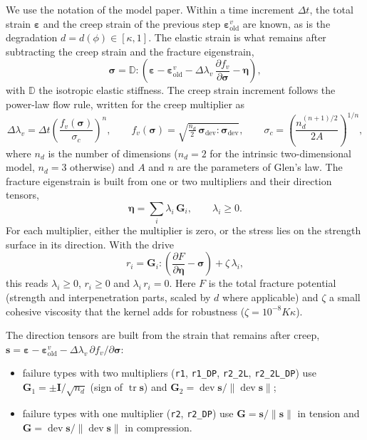 \documentclass[11pt,a4paper]{article}
\newcommand{\bsig}{\bm{\sigma}}
\newcommand{\beps}{\bm{\varepsilon}}
\newcommand{\bfeta}{\bm{\eta}}
\newcommand{\bG}{\bm{G}}
\newcommand{\tr}{\operatorname{tr}}
\newcommand{\dev}{\operatorname{dev}}
\begin{document}
We use the notation of the model paper. Within a time increment $\Delta t$, the total strain
$\beps$ and the creep strain of the previous step $\beps^v_\mathrm{old}$ are known, as is the
degradation $d=d(\phi)\in[\kappa,1]$. The elastic strain is what remains after subtracting the
creep strain and the fracture eigenstrain,
\begin{equation}
  \bsig = \mathbb{D}:\left(\beps-\beps^v_\mathrm{old}-\Delta\lambda_v\,\frac{\partial f_v}{\partial\bsig}-\bfeta\right),
  \label{eq:stress}
\end{equation}
with $\mathbb{D}$ the isotropic elastic stiffness. The creep strain increment follows the
power-law flow rule, written for the creep multiplier as
\begin{equation}
  \Delta\lambda_v = \Delta t\left(\frac{f_v(\bsig)}{\sigma_c}\right)^n,\qquad
  f_v(\bsig)=\sqrt{\tfrac{n_d}{2}\,\bsig_\mathrm{dev}:\bsig_\mathrm{dev}},\qquad
  \sigma_c=\left(\frac{n_d^{(n+1)/2}}{2A}\right)^{1/n},
  \label{eq:creep}
\end{equation}
where $n_d$ is the number of dimensions ($n_d=2$ for the intrinsic two-dimensional model,
$n_d=3$ otherwise) and $A$ and $n$ are the parameters of Glen's law. The fracture eigenstrain
is built from one or two multipliers and their direction tensors,
\begin{equation}
  \bfeta=\sum_i\lambda_i\,\bG_i,\qquad \lambda_i\geq0 .
\end{equation}
For each multiplier, either the multiplier is zero, or the stress lies on the strength surface
in its direction. With the drive
\begin{equation}
  r_i = \bG_i:\left(\frac{\partial F}{\partial\bfeta}-\bsig\right)+\zeta\,\lambda_i ,
  \label{eq:drive}
\end{equation}
this reads $\lambda_i\geq0$, $r_i\geq0$ and $\lambda_i\,r_i=0$. Here $F$ is the total fracture
potential (strength and interpenetration parts, scaled by $d$ where applicable) and $\zeta$ a
small cohesive viscosity that the kernel adds for robustness ($\zeta=10^{-8}K\kappa$).

The direction tensors are built from the strain that remains after creep,
$\bm{s}=\beps-\beps^v_\mathrm{old}-\Delta\lambda_v\,\partial f_v/\partial\bsig$:
\begin{itemize}
  \item failure types with two multipliers (\texttt{r1}, \texttt{r1\_DP},
    \texttt{r2\_2L}, \texttt{r2\_2L\_DP}) use $\bG_1=\pm\bm{I}/\sqrt{n_d}$ (sign of
    $\tr\bm{s}$) and $\bG_2=\dev\bm{s}/\|\dev\bm{s}\|$;
  \item failure types with one multiplier (\texttt{r2}, \texttt{r2\_DP}) use $\bG=\bm{s}/\|\bm{s}\|$ in tension and
    $\bG=\dev\bm{s}/\|\dev\bm{s}\|$ in compression.
\end{itemize}
\end{document}
